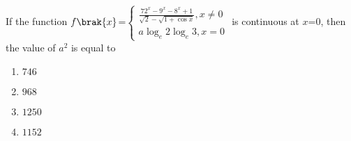     \item If the function $f\brak{x}$=$\begin{cases}\frac{72^x-9^x-8^x+1}{\sqrt{2}-\sqrt{1+\cos{x}}},x\neq 0\\a\log_e2\log_e3,x=0\end{cases}$ is continuous at $x$=$0$, then the value of $a^2$ is equal to
    \begin{enumerate}
        \item $746$
        \item $968$
        \item $1250$
        \item $1152$
    \end{enumerate}
   

